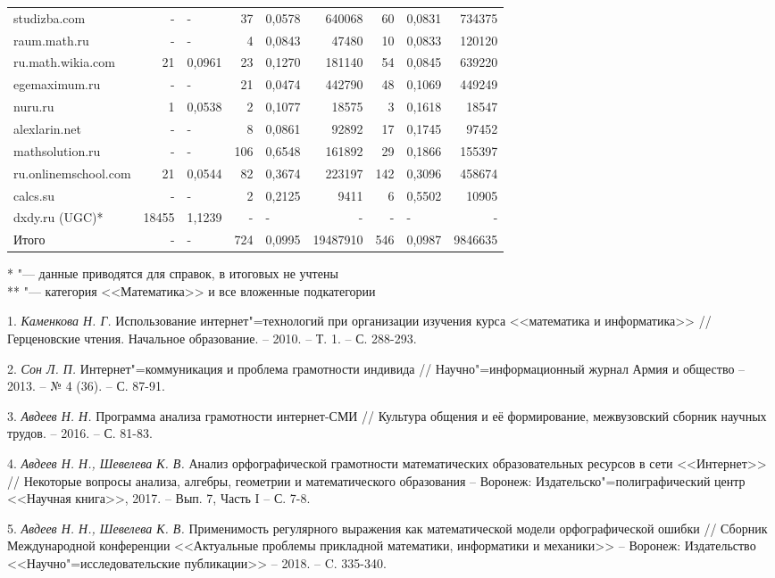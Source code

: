 {\begin{landscape}
\begin{tabular}{|l|r|l|r|l|r|r|l|r|}
studizba.com         &     -  & -      &  37  & 0,0578 &   640068  &   60  &  0,0831  &   734375  \\
raum.math.ru         &     -  & -      &   4  & 0,0843 &    47480  &   10  &  0,0833  &   120120  \\
ru.math.wikia.com    &    21  & 0,0961 &  23  & 0,1270 &   181140  &   54  &  0,0845  &   639220  \\
egemaximum.ru        &     -  & -      &  21  & 0,0474 &   442790  &   48  &  0,1069  &   449249  \\
nuru.ru              &     1  & 0,0538 &   2  & 0,1077 &    18575  &    3  &  0,1618  &    18547  \\
alexlarin.net        &     -  & -      &   8  & 0,0861 &    92892  &   17  &  0,1745  &    97452  \\
mathsolution.ru      &     -  & -      & 106  & 0,6548 &   161892  &   29  &  0,1866  &   155397  \\
ru.onlinemschool.com &    21  & 0,0544 &  82  & 0,3674 &   223197  &  142  &  0,3096  &   458674  \\
calcs.su             &     -  & -      &   2  & 0,2125 &     9411  &    6  &  0,5502  &    10905  \\
dxdy.ru (UGC)*       & 18455  & 1,1239 &   -  & -      &        -  &    -  &  -       &        -  \\
\hline
Итого                &     -  & -      & 724  & 0,0995 & 19487910  &  546  &  0,0987  &  9846635  \\
\hline
\end{tabular}
\end{landscape}
}
* "--- данные приводятся для справок, в итоговых не учтены
\\
** "--- категория <<Математика>> и все вложенные подкатегории
\\

\litlist

1. {\it Каменкова Н. Г.}
 Использование интернет"=технологий при организации изучения курса <<математика и информатика>>
 // Герценовские чтения. Начальное образование. – 2010. – Т. 1. – С. 288-293.

2. {\it Сон Л. П.}
 Интернет"=коммуникация и проблема грамотности индивида // Научно"=информационный журнал Армия и общество – 2013. – № 4 (36). – С. 87-91.

3. {\it Авдеев Н. Н.}
 Программа анализа грамотности интернет-СМИ // Культура общения и её формирование, межвузовский сборник научных трудов. – 2016. – С. 81-83.

4. {\it Авдеев Н. Н., Шевелева К. В.}
 Анализ орфографической грамотности математических образовательных ресурсов в сети <<Интернет>> // Некоторые вопросы анализа,
 алгебры, геометрии и математического образования – Воронеж: Издательско"=полиграфический центр <<Научная книга>>, 2017. – Вып. 7, Часть I – С. 7-8.

5. {\it Авдеев Н. Н., Шевелева К. В.}
 Применимость регулярного выражения как математической модели орфографической ошибки // Сборник Международной конференции <<Актуальные
 проблемы прикладной математики, информатики и механики>> – Воронеж: Издательство <<Научно"=исследовательские публикации>> – 2018. – C. 335-340.

